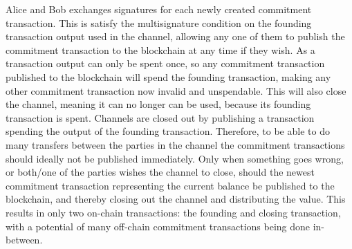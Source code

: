 Alice and Bob exchanges signatures for each newly created commitment transaction. This is satisfy the multisignature condition on the founding transaction output used in the channel, allowing any one of them to publish the commitment transaction to the blockchain at any time if they wish. As a transaction output can only be spent once, so any commitment transaction published to the blockchain will spend the founding transaction, making any other commitment transaction now invalid and unspendable. This will also close the channel, meaning it can no longer can be used, because its founding transaction is spent. Channels are closed out by publishing a transaction spending the output of the founding transaction. Therefore, to be able to do many transfers between the parties in the channel the commitment transactions should ideally not be published immediately. Only when something goes wrong, or both/one of the parties wishes the channel to close, should the newest commitment transaction representing the current balance be published to the blockchain, and thereby closing out the channel and distributing the value. This results in only two on-chain transactions: the founding and closing transaction, with a potential of many off-chain commitment transactions being done in-between.
\\

